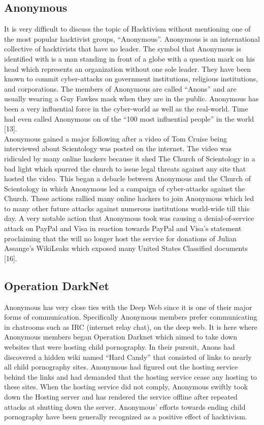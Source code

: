 \documentclass[twocolumn,letterpaper,10pt]{article}
\begin{document}
\subsection{Anonymous}
It is very difficult to discuss the topic of Hacktivism without mentioning one of the most popular hacktivist groups, “Anonymous”.  Anonymous is an international collective of hacktivists that have no leader. The symbol that Anonymous is identified with is a man standing in front of a globe with a question mark on his head which represents an organization without one sole leader. They have been known to commit cyber-attacks on government institutions, religious institutions, and corporations. The members of Anonymous are called “Anons” and are usually wearing a Guy Fawkes mask when they are in the public. Anonymous has been a very influential force in the cyber-world as well as the real-world.  Time had even called Anonymous on of the “100 most influential people” in the world [13].\\
\indent Anonymous gained a major following after a video of Tom Cruise being interviewed about Scientology was posted on the internet. The video was ridiculed by many online hackers because it shed The Church of Scientology in a bad light which spurred the church to issue legal threats against any site that hosted the video. This began a debacle between Anonymous and the Church of Scientology in which Anonymous led a campaign of cyber-attacks against the Church.  These actions rallied many online hackers to join Anonymous which led to many other future attacks against numerous institutions world-wide till this day.  A very notable action that Anonymous took was causing a denial-of-service attack on PayPal and Visa in reaction towards PayPal and Visa’s statement proclaiming that the will no longer host the service for donations of Julian Assange’s WikiLeaks which exposed many United States Classified documents [16].\\

\subsection{Operation DarkNet}
Anonymous has very close ties with the Deep Web since it is one of their major forms of communication. Specifically Anonymous members prefer communicating in chatrooms such as IRC (internet relay chat), on the deep web. It is here where Anonymous members began Operation Darknet which aimed to take down websites that were hosting child pornography. In their pursuit, Anons had discovered a hidden wiki named “Hard Candy” that consisted of links to nearly all child pornography sites. Anonymous had figured out the hosting service behind the links and had demanded that the hosting service cease any hosting to these sites. When the hosting service did not comply, Anonymous swiftly took down the Hosting server and has rendered the service offline after repeated attacks at shutting down the server. Anonymous’ efforts towards ending child pornography have been generally recognized as a positive effect of hacktivism.
\end{document}
